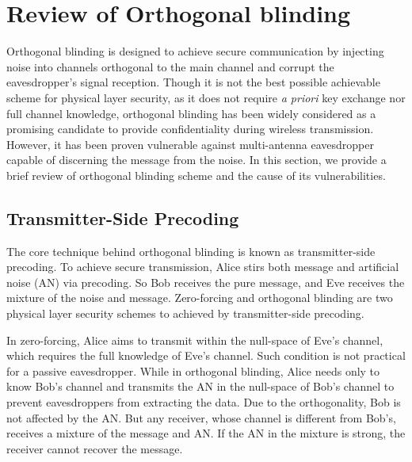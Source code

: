 \section{Review of Orthogonal blinding}
Orthogonal blinding is designed to achieve secure communication by injecting noise into channels orthogonal to the main channel and corrupt the eavesdropper's signal reception. Though it is not the best possible achievable scheme for physical layer security,  as it does not require \textit{a priori} key exchange nor full channel knowledge, orthogonal blinding has been widely considered as a promising candidate to provide confidentiality during wireless transmission. However, it has been proven vulnerable against multi-antenna eavesdropper capable of discerning the message from the noise. In this section, we provide a brief review of orthogonal blinding scheme and the cause of its vulnerabilities.

\subsection{Transmitter-Side Precoding}
The core technique behind orthogonal blinding is known as transmitter-side precoding. To achieve secure transmission, Alice stirs both message and artificial noise (AN) via precoding. So Bob receives the pure message, and Eve receives the mixture of the noise and message. Zero-forcing and orthogonal blinding are two physical layer security schemes to achieved by transmitter-side precoding. 

In zero-forcing, Alice aims to transmit within the null-space of Eve's channel, which requires the full knowledge of Eve's channel. Such condition is not practical for a passive eavesdropper. While in orthogonal blinding, Alice needs only to know Bob's channel and transmits the AN in the null-space of Bob's channel to prevent eavesdroppers from extracting the data. Due to the orthogonality, Bob is not affected by the AN. But any receiver, whose channel is different from Bob's, receives a mixture of the message and AN. If the AN  in the mixture is strong, the receiver cannot recover the message.

